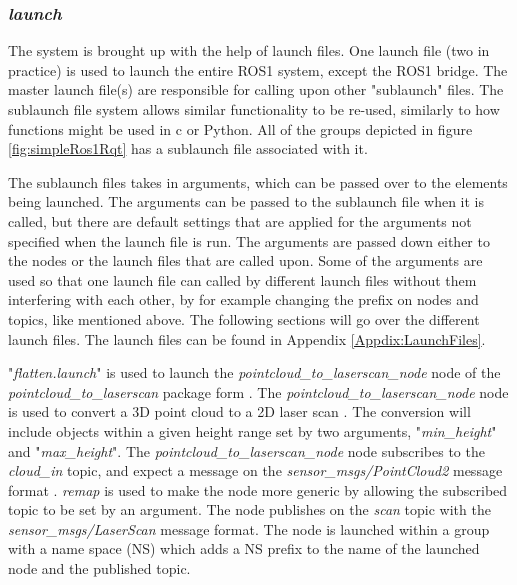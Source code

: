\subsubsection{\textit{launch}}
The system is brought up with the help of launch files. One launch file (two in practice) is used to launch the entire ROS1 system, except the ROS1 bridge. The master launch file(s) are responsible for calling upon other "sublaunch" files. The sublaunch file system allows similar functionality to be re-used, similarly to how functions might be used in c or Python. All of the groups depicted in figure \ref{fig:simpleRos1Rqt} has a sublaunch file associated with it. %

The sublaunch files takes in arguments, which can be passed over to the elements being launched. The arguments can be passed to the sublaunch file when it is called, but there are default settings that are applied for the arguments not specified when the launch file is run. The arguments are passed down either to the nodes or the launch files that are called upon. Some of the arguments are used so that one launch file can called by different launch files without them interfering with each other, by for example changing the prefix on nodes and topics, like mentioned above. The following sections will go over the different launch files. The launch files can be found in Appendix \ref{Appdix:LaunchFiles}.

\label{subsubsec:flatten.launch}
"\textit{flatten.launch}" is used to launch the \textit{pointcloud\_to\_laserscan\_node} 
node of the \textit{pointcloud\_to\_laserscan} package form \cite{ros2-pointcloud-laserscan}. The \textit{pointcloud\_to\_laserscan\_node} node is used to convert a 3D point cloud to a 2D laser scan \cite{pcl_ros}. The conversion will include objects within a given height range set by two arguments, "\textit{min\_height}" and "\textit{max\_height}". The \textit{pointcloud\_to\_laserscan\_node} node subscribes to the \textit{cloud\_in} topic, and expect a message on the \textit{sensor\_msgs/PointCloud2} message format \cite{pcl_ros}. \textit{remap} is used to make the node more generic by allowing the subscribed topic to be set by an argument. The node publishes on the \textit{scan} topic with the \textit{sensor\_msgs/LaserScan} message format. The node is launched within a group with a name space (NS) which adds a NS prefix to the name of the launched node and the published topic.

